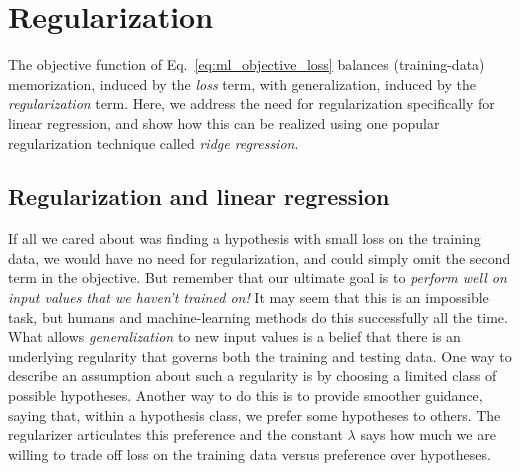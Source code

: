\section{Regularization}

\label{sec-regularization}

The objective function of Eq.~\ref{eq:ml_objective_loss} balances
(training-data) memorization, induced by the {\em loss} term, with generalization,
induced by the {\em regularization} term.  Here, we address the need
for regularization specifically for linear regression, and show how
this can be realized using one popular regularization technique called {\em ridge regression}.

\subsection{Regularization and linear regression}

If all we cared about was finding a hypothesis with small loss on the
training data, we would have no need for regularization, and could
simply omit the second term in the objective.  But remember that our
ultimate goal is to {\em perform well on input values that we haven't
    trained on!}  It may seem that this is an impossible task, but
humans and machine-learning methods do this successfully all the
time.  What allows {\em generalization} to new input values is a
belief that there is an underlying regularity that governs both the
training and testing data.  One way to
describe an assumption about such a regularity is by choosing a
limited class of possible hypotheses.  Another way to do this is to
provide smoother guidance, saying that, within a hypothesis class, we
prefer some hypotheses to others.  The regularizer articulates this
preference and the constant $\lambda$ says how much we are willing to
trade off loss on the training data versus preference over hypotheses.


